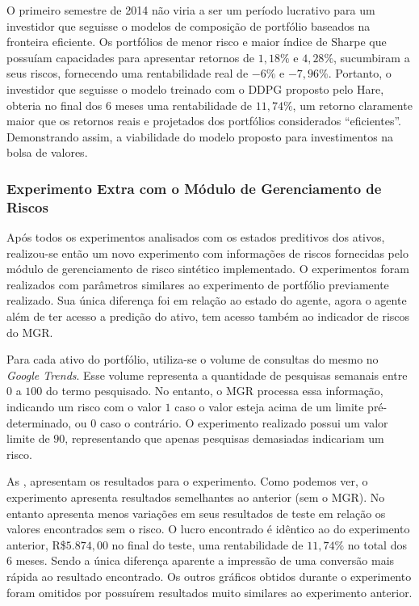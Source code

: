 O primeiro semestre de 2014 não viria a ser um período lucrativo para um investidor que seguisse o modelos de composição de portfólio baseados na fronteira eficiente. Os portfólios de menor risco e maior índice de Sharpe que possuíam capacidades para apresentar retornos de $1,18\%$ e $4,28\%$, sucumbiram a seus riscos, fornecendo uma rentabilidade real de $-6\%$ e $-7,96\%$. Portanto, o investidor que seguisse o modelo treinado com o \acrshort{DDPG} proposto pelo Hare, obteria no final dos 
$6$ meses uma rentabilidade de $11,74\%$, um retorno claramente maior que os retornos reais e projetados dos portfólios considerados ``eficientes''. Demonstrando assim, a viabilidade do modelo proposto para investimentos na bolsa de valores.

\subsubsection{Experimento Extra com o Módulo de Gerenciamento de Riscos}

Após todos os experimentos analisados com os estados preditivos dos ativos, realizou-se então um novo experimento com informações de riscos fornecidas pelo módulo de gerenciamento de risco sintético implementado. O experimentos foram realizados com parâmetros similares ao experimento de portfólio previamente realizado. Sua única diferença foi em relação ao estado do agente, agora o agente além de ter acesso a predição do ativo, tem acesso também ao indicador de riscos do \acrshort{MGR}.

Para cada ativo do portfólio, utiliza-se o volume de consultas do mesmo no \emph{Google Trends}. Esse volume representa a quantidade de pesquisas semanais entre $0$ a $100$ do termo pesquisado. No entanto, o \acrshort{MGR} processa essa informação, indicando um risco com o valor $1$ caso o valor esteja acima de um limite pré-determinado, ou $0$ caso o contrário. O experimento realizado possui um valor limite de $90$, representando que apenas pesquisas demasiadas indicariam um risco.

As , apresentam os resultados para o experimento. Como podemos ver, o experimento apresenta resultados semelhantes ao anterior (sem o \acrshort{MGR}). No entanto apresenta menos variações em seus resultados de teste em relação os valores encontrados sem o risco. O lucro encontrado é idêntico ao do experimento anterior, R\$$5.874,00$ no final do teste, uma rentabilidade de $11,74\%$ no total dos 6 meses. Sendo a única diferença aparente a impressão de uma conversão mais rápida ao resultado encontrado. Os outros gráficos obtidos durante o experimento foram omitidos por possuírem resultados muito similares ao experimento anterior. 

